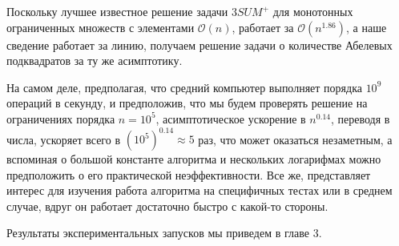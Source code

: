 Поскольку лучшее известное решение задачи $3SUM^+$ для монотонных ограниченных множеств с элементами $\mathcal{O}(n)$, работает за $\mathcal{O}(n^{1.86})$, а наше сведение работает за линию, получаем решение задачи о количестве Абелевых подквадратов за ту же асимптотику.

На самом деле, предполагая, что средний компьютер выполняет порядка $10^9$ операций в секунду, и предположив, что мы будем проверять решение на ограничениях порядка $n=10^5$, асимптотическое ускорение в $n^{0.14}$, переводя в числа, ускоряет всего в ${(10^5)}^{0.14} \approx 5$ раз, что может оказаться незаметным, а вспоминая о большой константе алгоритма и нескольких логарифмах можно предположить о его практической неэффективности. Все же, представляет интерес для изучения работа алгоритма на специфичных тестах или в среднем случае, вдруг он работает достаточно быстро с какой-то стороны. 

Результаты экспериментальных запусков мы приведем в главе 3.

